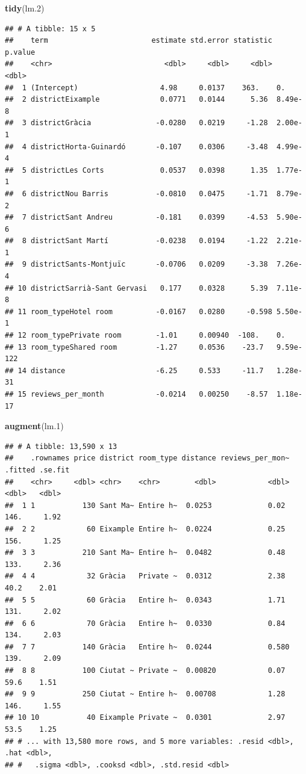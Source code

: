 \documentclass[]{article}
\newenvironment{Shaded}{\begin{snugshade}}{\end{snugshade}}
\newcommand{\FloatTok}[1]{\textcolor[rgb]{0.00,0.00,0.81}{#1}}
\newcommand{\KeywordTok}[1]{\textcolor[rgb]{0.13,0.29,0.53}{\textbf{#1}}}
\newcommand{\NormalTok}[1]{#1}
\begin{document}
\begin{Shaded}
\begin{Highlighting}[]
\KeywordTok{tidy}\NormalTok{(lm}\FloatTok{.2}\NormalTok{)}
\end{Highlighting}
\end{Shaded}

\begin{verbatim}
## # A tibble: 15 x 5
##    term                        estimate std.error statistic   p.value
##    <chr>                          <dbl>     <dbl>     <dbl>     <dbl>
##  1 (Intercept)                   4.98     0.0137    363.    0.       
##  2 districtEixample              0.0771   0.0144      5.36  8.49e-  8
##  3 districtGràcia               -0.0280   0.0219     -1.28  2.00e-  1
##  4 districtHorta-Guinardó       -0.107    0.0306     -3.48  4.99e-  4
##  5 districtLes Corts             0.0537   0.0398      1.35  1.77e-  1
##  6 districtNou Barris           -0.0810   0.0475     -1.71  8.79e-  2
##  7 districtSant Andreu          -0.181    0.0399     -4.53  5.90e-  6
##  8 districtSant Martí           -0.0238   0.0194     -1.22  2.21e-  1
##  9 districtSants-Montjuïc       -0.0706   0.0209     -3.38  7.26e-  4
## 10 districtSarrià-Sant Gervasi   0.177    0.0328      5.39  7.11e-  8
## 11 room_typeHotel room          -0.0167   0.0280     -0.598 5.50e-  1
## 12 room_typePrivate room        -1.01     0.00940  -108.    0.       
## 13 room_typeShared room         -1.27     0.0536    -23.7   9.59e-122
## 14 distance                     -6.25     0.533     -11.7   1.28e- 31
## 15 reviews_per_month            -0.0214   0.00250    -8.57  1.18e- 17
\end{verbatim}

\begin{Shaded}
\begin{Highlighting}[]
\KeywordTok{augment}\NormalTok{(lm}\FloatTok{.1}\NormalTok{)}
\end{Highlighting}
\end{Shaded}

\begin{verbatim}
## # A tibble: 13,590 x 13
##    .rownames price district room_type distance reviews_per_mon~ .fitted .se.fit
##    <chr>     <dbl> <chr>    <chr>        <dbl>            <dbl>   <dbl>   <dbl>
##  1 1           130 Sant Ma~ Entire h~  0.0253             0.02    146.     1.92
##  2 2            60 Eixample Entire h~  0.0224             0.25    156.     1.25
##  3 3           210 Sant Ma~ Entire h~  0.0482             0.48    133.     2.36
##  4 4            32 Gràcia   Private ~  0.0312             2.38     40.2    2.01
##  5 5            60 Gràcia   Entire h~  0.0343             1.71    131.     2.02
##  6 6            70 Gràcia   Entire h~  0.0330             0.84    134.     2.03
##  7 7           140 Gràcia   Entire h~  0.0244             0.580   139.     2.09
##  8 8           100 Ciutat ~ Private ~  0.00820            0.07     59.6    1.51
##  9 9           250 Ciutat ~ Entire h~  0.00708            1.28    146.     1.55
## 10 10           40 Eixample Private ~  0.0301             2.97     53.5    1.25
## # ... with 13,580 more rows, and 5 more variables: .resid <dbl>, .hat <dbl>,
## #   .sigma <dbl>, .cooksd <dbl>, .std.resid <dbl>
\end{verbatim}
\end{document}
